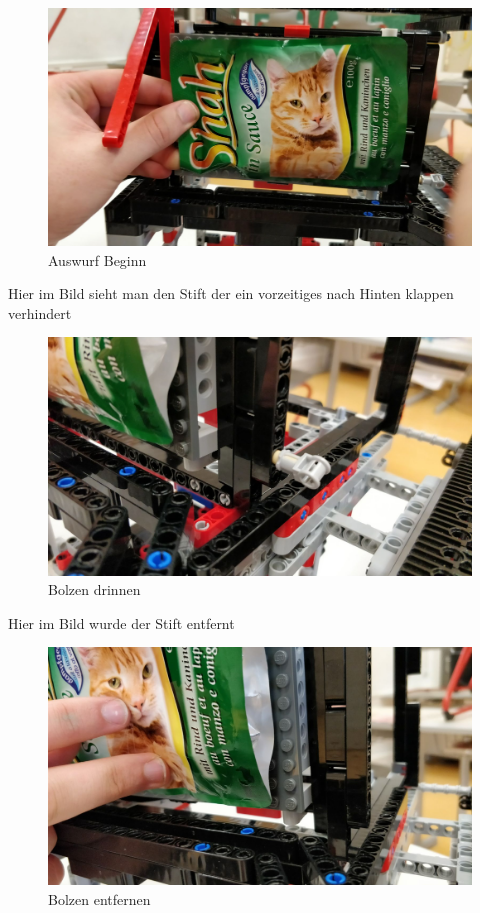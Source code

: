\begin{figure}[H]
\begin{center}
\includegraphics[width=13cm]{Bilder/Ablauf_1_png/Auswurf_1}
\caption{Auswurf Beginn}
\end{center}
\end{figure}

Hier im Bild sieht man den Stift der ein vorzeitiges nach Hinten klappen verhindert

\begin{figure}[H]
\begin{center}
\includegraphics[width=13cm]{Bilder/Ablauf_1_png/Auswurf_2}
\caption{Bolzen drinnen}
\label{sad}
\end{center}
\end{figure}


Hier im Bild wurde der Stift entfernt 

\begin{figure}[H]
\begin{center}
\includegraphics[width=13cm]{Bilder/Ablauf_1_png/Auswurf_3}
\caption{Bolzen entfernen}
\end{center}
\end{figure}

